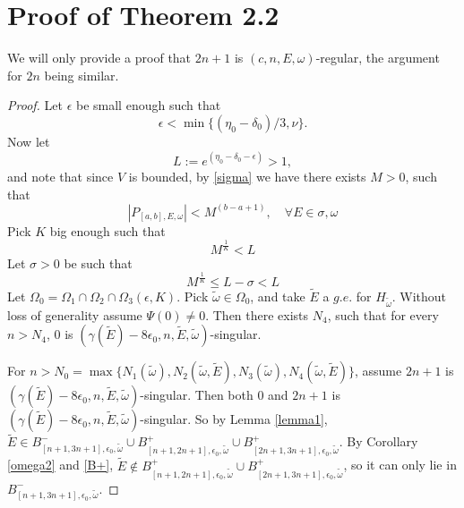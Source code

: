 \section{Proof of Theorem 2.2}
We will only provide a proof that $2n+1$ is $(c, n, E,\omega)$-regular, the argument for $2n$ being similar.
\begin{proof}
Let $\epsilon$ be small enough such that
  \begin{equation}\label{epsilon1}
    \epsilon<\min\{(\eta_0-\delta_0)/3,\nu\}.
  \end{equation}
Now let
  \[L:=e^{(\eta_0-\delta_0-\epsilon)}>1,\]
and note that since $V$ is bounded, by \eqref{sigma} we have there exists $ M>0$, such that
\[
|P_{[a,b],E,\omega}|<M^{(b-a+1)},\quad \forall E\in\sigma,\omega
\]
Pick $K$ big enough such that
  \[M^{\frac{1}{K}}<L\]
Let $\sigma>0$ be such that
\begin{equation}\label{K}
M^{\frac{1}{K}}\leq L-\sigma<L
\end{equation}
Let $\Omega_0=\Omega_1\cap\Omega_2\cap\Omega_3(\epsilon,K)$. Pick $\tilde{\omega}\in\Omega_0$, and take $\tilde{E}$ a $g.e.$ for $H_{\tilde{\omega}}$.
Without loss of generality assume $\Psi(0)\neq 0$. Then there exists $ N_4$, such that for every $ n>N_4$, 0 is $(\gamma(\tilde{E})-8\epsilon_0,n,\tilde{E},\tilde{\omega})$-singular.


For $n>N_0=\max\{N_1(\tilde{\omega}),N_2(\tilde{\omega},\tilde{E}),N_3(\tilde{\omega}),N_4(\tilde{\omega},\tilde{E})\}$, assume $2n+1$ is $(\gamma(\tilde{E})-8\epsilon_0,n,\tilde{E},\tilde{\omega})$-singular.
 Then both $0$ and $2n+1$ is $(\gamma(\tilde{E})-8\epsilon_0,n,\tilde{E},\tilde{\omega})$-singular. So by Lemma \ref{lemma1},
  $\tilde{E}\in B_{[n+1,3n+1],\epsilon_0,\tilde{\omega}}^-\cup B_{[n+1,2n+1],\epsilon_0,\tilde{\omega}}^+ \cup B_{[2n+1,3n+1],\epsilon_0,\tilde{\omega}}^+ $.
  By Corollary \ref{omega2} and \eqref{B+}, $\tilde{E}\notin B_{[n+1,2n+1],\epsilon_0,\tilde{\omega}}^+\cup B_{[2n+1,3n+1],\epsilon_0,\tilde{\omega}}^+$, so it can only lie in $B_{[n+1,3n+1],\epsilon_0,\tilde{\omega}}^-$.


\end{proof}
